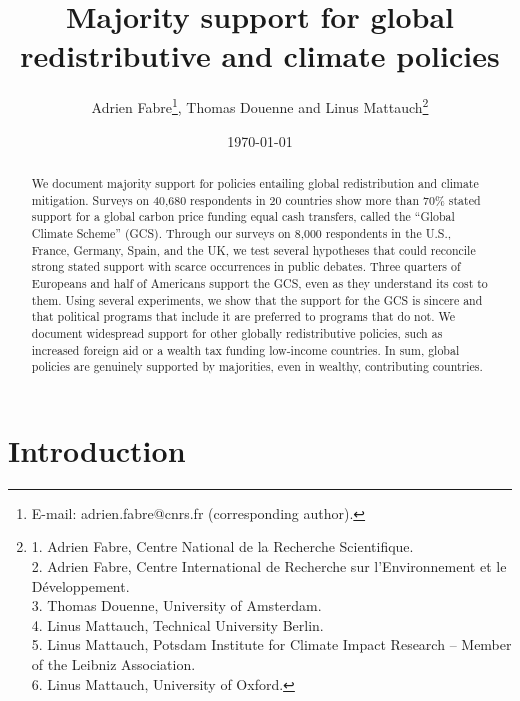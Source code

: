 \documentclass[12pt,english]{article}
\title{Majority support for global redistributive and climate policies
}
\author{Adrien Fabre\footnote{E-mail: adrien.fabre@cnrs.fr (corresponding author).}, Thomas Douenne\; and Linus Mattauch\footnote{1. Adrien Fabre, Centre National de la Recherche Scientifique.\\
2. Adrien Fabre, Centre International de Recherche sur l'Environnement et le Développement.\\
3. Thomas Douenne, University of Amsterdam.\\
4. Linus Mattauch, Technical University Berlin.\\
5. Linus Mattauch, Potsdam Institute for Climate Impact Research – Member of the Leibniz Association.\\
6. Linus Mattauch, University of Oxford.}
} %
\date{\today} %
\begin{document}
\maketitle

\begin{center}
\end{center}

\begin{abstract}

  We document majority support for policies entailing global redistribution and climate mitigation. Surveys on 40,680 respondents in 20 countries show more than 70\% stated support for a global carbon price funding equal cash transfers, called the ``Global Climate Scheme'' (GCS). Through our %
  surveys on 8,000 respondents in the U.S., France, Germany, Spain, and the UK, we test several hypotheses that could reconcile strong stated support with scarce occurrences in public debates. 
  Three quarters of Europeans and half of Americans support the GCS, even as they understand its cost to them. Using several experiments, we show that the support for the GCS is sincere and that political programs that include it are preferred to programs that do not. %
  We document widespread support for other globally redistributive policies, such as increased foreign aid or a wealth tax funding low-income countries. In sum, global policies are genuinely supported by majorities, even in wealthy, contributing countries. 
\end{abstract}


\onehalfspacing %
\section{Introduction}%
\end{document}
